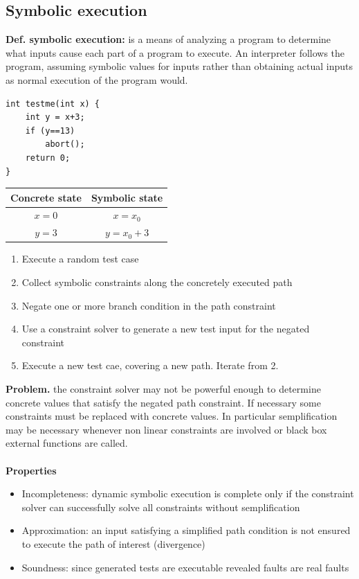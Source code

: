 \documentclass[10pt,a4paper]{article}
\begin{document}
\subsection{Symbolic execution}
\textbf{Def. symbolic execution:} is a means of analyzing a program to determine what inputs cause each part of a program to execute. An interpreter follows the program, assuming symbolic values for inputs rather than obtaining actual inputs as normal execution of the program would.
\begin{verbatim}
int testme(int x) {
	int y = x+3;
	if (y==13)
		abort();
	return 0;		
}
\end{verbatim}
\begin{center}
\begin{tabular}{|c|c|}
\hline 
Concrete state & Symbolic state \\ 
\hline 
$x=0$ & $x=x_0$ \\ 
\hline 
$y=3$ & $y=x_0+3$ \\ 
\hline 
\end{tabular} 
\end{center}
\begin{enumerate}
\item Execute a random test case
\item Collect symbolic constraints along the concretely executed path
\item Negate one or more branch condition in the path constraint
\item Use a constraint solver to generate a new test input for the negated constraint
\item Execute a new test cae, covering a new path. Iterate from 2.
\end{enumerate}
\textbf{Problem.} the constraint solver may not be powerful enough to determine concrete values that satisfy the negated path constraint. If necessary some constraints must be replaced with concrete values. In particular semplification may be necessary whenever non linear constraints  are involved or black box external functions are called.\\\\
\textbf{Properties}
\begin{itemize}
\item Incompleteness: dynamic symbolic execution is complete only if the constraint solver can successfully solve all constraints without semplification
\item Approximation: an input satisfying a simplified path condition is not ensured to execute the path of interest (divergence)
\item Soundness: since generated tests are executable revealed faults are real faults
\end{itemize}
\end{document}
